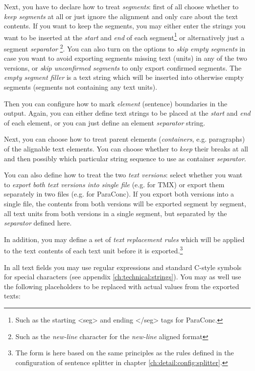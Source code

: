 \documentclass[a4paper,10pt,oneside]{book}
\begin{document}
Next, you have to declare how to treat \emph{segments}: first of all choose whether to \emph{keep segments} at all or just ignore the alignment and only care about the text contents. If you want to keep the segments, you may either enter the strings you want to be inserted at the \emph{start} and \emph{end} of each segment\footnote{Such as the starting <seg> and ending </seg> tags for ParaConc.} or alternatively just a segment \emph{separator} \footnote{Such as the \emph{new-line} character for the \emph{new-line} aligned format}. You can also turn on the options to \emph{skip empty segments} in case you want to avoid exporting segments missing text (units) in any of the two versions, or \emph{skip unconfirmed segments} to only export confirmed segments. The \emph{empty segment filler} is a text string which will be inserted into otherwise empty segments (segments not containing any text units).

Then you can configure how to mark \emph{element} (sentence) boundaries in the output. Again, you can either define text strings to be placed at the \emph{start} and \emph{end} of each element, or you can just define an element \emph{separator} string.

Next, you can choose how to treat parent elements (\emph{containers}, e.g. paragraphs) of the alignable text elements. You can choose whether to \emph{keep} their breaks at all and then possibly which particular string sequence to use as container \emph{separator}.

You can also define how to treat the two \emph{text versions}: select whether you want to \emph{export both text versions into single file} (e.g. for TMX) or export them separately in two files (e.g. for ParaConc). If you export both versions into a single file, the contents from both versions will be exported segment by segment, all text units from both versions in a single segment, but separated by the \emph{separator} defined here.

In addition, you may define a set of \emph{text replacement rules} which will be applied to the text contents of each text unit before it is exported.\footnote{The form is here based on the same principles as the rules defined in the configuration of sentence splitter in chapter \ref{ch:detail:config:splitter}.}

In all text fields you may use regular expressions and standard C-style symbols for special characters (see appendix \ref{ch:technical:strings}). You may as well use the following placeholders to be replaced with actual values from the exported texts:
\end{document}
